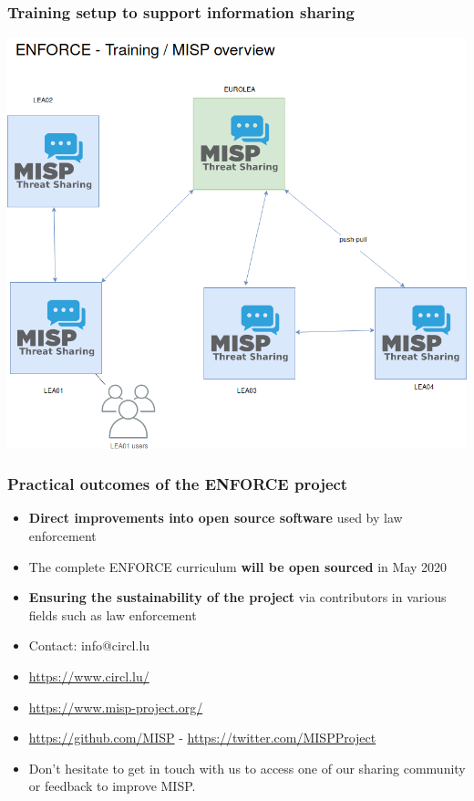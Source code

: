 \begin{frame}
        \frametitle{Training setup to support information sharing}
        \includegraphics[scale=0.27]{enforce-misp.png}
\end{frame}


\begin{frame}
\frametitle{Practical outcomes of the ENFORCE project}
        \begin{itemize}
                \item {\bf Direct improvements into open source software} used by law enforcement
                \item The complete ENFORCE curriculum {\bf will be open sourced} in May 2020
                \item {\bf Ensuring the sustainability of the project} via contributors in various fields such as law enforcement
        \end{itemize}
\end{frame}



\begin{frame}
\begin{itemize}
\item Contact: info@circl.lu
\item \url{https://www.circl.lu/}
\item \url{https://www.misp-project.org/}
\item \url{https://github.com/MISP} - \url{https://twitter.com/MISPProject}
\item Don't hesitate to get in touch with us to access one of our sharing community or feedback to improve MISP.
\end{itemize}

\end{frame}
